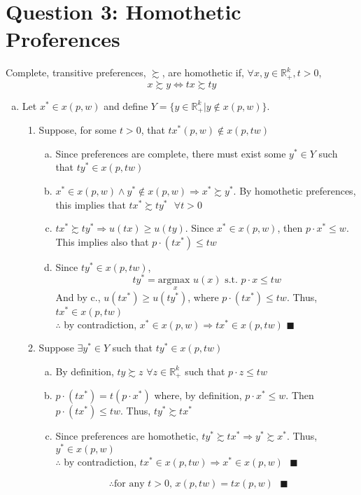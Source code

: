 \documentclass{article}
\newcommand{\R}{\mathbb{R}}
\begin{document}
\section*{Question 3: Homothetic Proferences}
Complete, transitive preferences, $\succsim$, are homothetic if, $\forall x,y\in\R_+^k,t>0$,
\[
	x\succsim y\iff tx\succsim ty
\]
\begin{enumerate}[(a)]
	\item Let $x^*\in x(p,w)$ and define $Y=\{y\in\R^k_+|y\notin x(p,w)\}$.
		\begin{enumerate}[1.]
			\item Suppose, for some $t>0$, that ${tx^*(p,w)\notin x(p,tw)}$
				\begin{enumerate}[a.]
					\item Since preferences are complete, there must exist some ${y^*\in Y}$ such that ${ty^*\in x(p,tw)}$
					\item ${x^*\in x(p,w)\land y^*\notin x(p,w)\Rightarrow x^*\succsim y^*}$. By homothetic preferences, this implies that ${tx^*\succsim ty^*\text{ }\forall t>0}$
					\item $tx^*\succsim ty^*\Rightarrow u(tx)\geq u(ty)$. Since $x^*\in x(p,w)$, then ${p\cdot x^*\leq w}$. This implies also that ${p\cdot (tx^*)\leq tw}$
					\item Since ${ty^*\in x(p,tw)}$, 
						\[
							ty^*=\underset{x}{\text{argmax }}u(x)\text{ s.t. }p\cdot x\leq tw
						\]
						And by c., $u(tx^*)\geq u(ty^*)$, where ${p\cdot (tx^*)\leq tw}$. Thus, $tx^*\in x(p,tw)$ 
						\smallskip \\
						$\therefore$ by contradiction, ${x^*\in x(p,w)\Rightarrow tx^*\in x(p,tw)}$ $\blacksquare$
				\end{enumerate}
			\item Suppose $\exists y^*\in Y$ such that $ty^*\in x(p,tw)$
				\begin{enumerate}[a.]
					\item By definition, $ty\succsim z$ $\forall z\in\R^k_+$ such that ${p\cdot z\leq tw}$
					\item $p\cdot(tx^*)=t(p\cdot x^*)$ where, by definition, $p\cdot x^*\leq w$. Then ${p\cdot(tx^*)\leq tw}$. Thus, ${ty^*\succsim tx^*}$
					\item Since preferences are homothetic, ${ty^*\succsim tx^*\Rightarrow y^*\succsim x^*}$. Thus, $y^*\in x(p,w)$ 
					\smallskip \\
					$\therefore$ by contradiction, ${tx^*\in x(p,tw)\Rightarrow x^*\in x(p,w)}\text{ }\blacksquare$
				\end{enumerate}
			\[
				\therefore\text{for any }t>0\text{, }x(p,tw)=tx(p,w)\text{ }\blacksquare
			\]
		\end{enumerate}
		

\end{enumerate}
\end{document}
